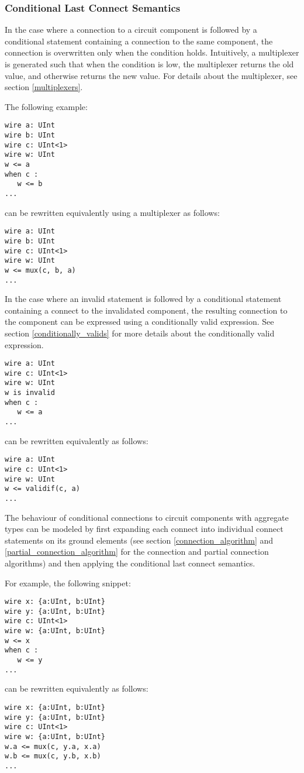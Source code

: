 \documentclass[12pt]{article}
\begin{document}
\subsubsection{Conditional Last Connect Semantics}\label{conditional_last_connect}
In the case where a connection to a circuit component is followed by a conditional statement containing a connection to the same component, the connection is overwritten only when the condition holds. Intuitively, a multiplexer is generated such that when the condition is low, the multiplexer returns the old value, and otherwise returns the new value. For details about the multiplexer, see section \ref{multiplexers}.

The following example:
\begin{lstlisting}
wire a: UInt
wire b: UInt
wire c: UInt<1>
wire w: UInt
w <= a
when c :
   w <= b
...
\end{lstlisting}
can be rewritten equivalently using a multiplexer as follows:
\begin{lstlisting}
wire a: UInt
wire b: UInt
wire c: UInt<1>
wire w: UInt
w <= mux(c, b, a)
...
\end{lstlisting}

In the case where an invalid statement is followed by a conditional statement containing a connect to the invalidated component, the resulting connection to the component can be expressed using a conditionally valid expression. See section \ref{conditionally_valids} for more details about the conditionally valid expression.
\begin{lstlisting}
wire a: UInt
wire c: UInt<1>
wire w: UInt
w is invalid
when c :
   w <= a
...
\end{lstlisting}
can be rewritten equivalently as follows:
\begin{lstlisting}
wire a: UInt
wire c: UInt<1>
wire w: UInt
w <= validif(c, a)
...
\end{lstlisting}

The behaviour of conditional connections to circuit components with aggregate types can be modeled by first expanding each connect into individual connect statements on its ground elements (see section \ref{connection_algorithm} and \ref{partial_connection_algorithm} for the connection and partial connection algorithms) and then applying the conditional last connect semantics.

For example, the following snippet:
\begin{lstlisting}
wire x: {a:UInt, b:UInt}
wire y: {a:UInt, b:UInt}
wire c: UInt<1>
wire w: {a:UInt, b:UInt}
w <= x
when c :
   w <= y
...
\end{lstlisting}
can be rewritten equivalently as follows:
\begin{lstlisting}
wire x: {a:UInt, b:UInt}
wire y: {a:UInt, b:UInt}
wire c: UInt<1>
wire w: {a:UInt, b:UInt}
w.a <= mux(c, y.a, x.a)
w.b <= mux(c, y.b, x.b)
...
\end{lstlisting}
\end{document}
